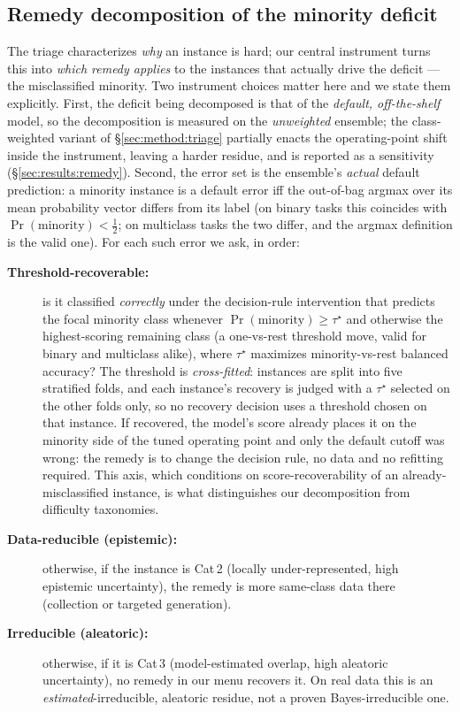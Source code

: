 \subsection{Remedy decomposition of the minority deficit}\label{sec:method:remedy}

The triage characterizes \emph{why} an instance is hard; our central instrument
turns this into \emph{which remedy applies} to the instances that actually drive
the deficit --- the misclassified minority. Two instrument choices matter here
and we state them explicitly. First, the deficit being decomposed is that of the
\emph{default, off-the-shelf} model, so the decomposition is measured on the
\emph{unweighted} ensemble; the class-weighted variant of
\S\ref{sec:method:triage} partially enacts the operating-point shift inside the
instrument, leaving a harder residue, and is reported as a sensitivity
(\S\ref{sec:results:remedy}). Second, the error set is the ensemble's
\emph{actual} default prediction: a minority instance is a default error iff the
out-of-bag argmax over its mean probability vector differs from its label (on
binary tasks this coincides with $\Pr(\text{minority})<\tfrac12$; on multiclass
tasks the two differ, and the argmax definition is the valid one). For each such
error we ask, in order:
\begin{description}
\item[\textbf{Threshold-recoverable:}] is it classified \emph{correctly} under
  the decision-rule intervention that predicts the focal minority class whenever
  $\Pr(\text{minority})\ge\tau^\star$ and otherwise the highest-scoring remaining
  class (a one-vs-rest threshold move, valid for binary and multiclass alike),
  where $\tau^\star$ maximizes minority-vs-rest balanced accuracy? The threshold
  is \emph{cross-fitted}: instances are split into five stratified folds, and
  each instance's recovery is judged with a $\tau^\star$ selected on the other
  folds only, so no recovery decision uses a threshold chosen on that instance.
  If recovered, the model's score already places it on the minority side of the
  tuned operating point and only the default cutoff was wrong: the remedy is to
  change the decision rule, no data and no refitting required. This axis, which
  conditions on score-recoverability of an already-misclassified instance, is
  what distinguishes our decomposition from difficulty taxonomies.
\item[\textbf{Data-reducible (epistemic):}] otherwise, if the instance is Cat\,2
  (locally under-represented, high epistemic uncertainty), the remedy is more
  same-class data there (collection or targeted generation).
\item[\textbf{Irreducible (aleatoric):}] otherwise, if it is Cat\,3
  (model-estimated overlap, high aleatoric uncertainty), no remedy in our menu
  recovers it. On real data this is an \emph{estimated}-irreducible, aleatoric
  residue, not a proven Bayes-irreducible one.
\end{description}
